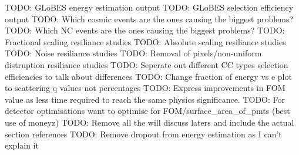 TODO: GLoBES energy estimation output
TODO: GLoBES selection efficiency output
TODO: Which cosmic events are the ones causing the biggest problems?
TODO: Which NC events are the ones causing the biggest problems?
TODO: Fractional scaling resiliance studies
TODO: Absolute scaling resiliance studies
TODO: Noise resiliance studies
TODO: Removal of pixels/non-uniform distruption resiliance studies
TODO: Seperate out different CC types selection efficiencies to talk about differences
TODO: Change fraction of energy vs e plot to scattering q values not percentages
TODO: Express improvements in FOM value as less time required to reach the same physics significance.
TODO: For detector optimisations want to optimise for FOM/surface_area_of_pmts (best use of
moneyz)
TODO: Remove all the will discuss laters and include the actual section references
TODO: Remove dropout from energy estimation as I can't explain it